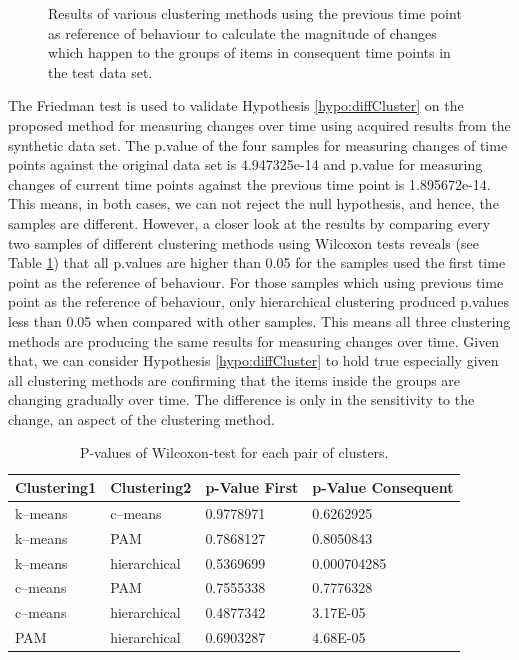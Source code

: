 \begin{figure}[!h]
{\begin{minipage}{\dimexpr \textwidth-2\fboxsep-2\fboxrule}
    \end{minipage}}
    \caption{Results of various clustering methods using the previous time point as reference of behaviour to calculate the magnitude of changes which happen to the groups of items in consequent time points in the test data set.}
    \label{fig:test_ChangeMeasuers_Cons}
\end{figure}
                 
                 
                 
The Friedman test is used to validate Hypothesis \ref{hypo:diffCluster} on the proposed method for measuring changes over time using acquired results from the synthetic data set. The p.value of the four samples for measuring changes of time points against the original data set is 4.947325e-14 and p.value for measuring changes of current time points against the previous time point is 1.895672e-14. This means, in both cases, we can not reject the null hypothesis, and hence, the samples are different. However, a closer look at the results by comparing every two samples of different clustering methods using Wilcoxon tests reveals (see Table \ref{tab:Cluster_Pvalue_Test}) that all p.values are higher than 0.05 for the samples used the first time point as the reference of behaviour. For those samples which using previous time point as the reference of behaviour, only hierarchical clustering produced p.values less than 0.05 when compared with other samples. This means all three clustering methods are producing the same results for measuring changes over time. Given that, we can consider Hypothesis \ref{hypo:diffCluster}  to hold true especially given all clustering methods are confirming that the items inside the groups are changing gradually over time. The difference is only in the sensitivity to the change, an aspect of the clustering method.

\begin{table}[!h]
    \small
    \centering
    \caption{ P-values of Wilcoxon-test for each pair of clusters.}
    \label{tab:Cluster_Pvalue_Test}
    \begin{tabular}{llll}
        \toprule
        \textbf{Clustering1} & \textbf{Clustering2}  & \textbf{p-Value First} & \textbf{p-Value Consequent} \\ \midrule
        k--means      & c--means       & 0.9778971     & 0.6262925          \\ 
        k--means      & PAM          & 0.7868127     & 0.8050843          \\ 
        k--means      & hierarchical & 0.5369699     & 0.000704285        \\ 
        c--means      & PAM          & 0.7555338     & 0.7776328          \\ 
        c--means      & hierarchical & 0.4877342     & 3.17E-05           \\ 
        PAM         & hierarchical & 0.6903287     & 4.68E-05           \\ 
        \bottomrule
    \end{tabular}
\end{table}


